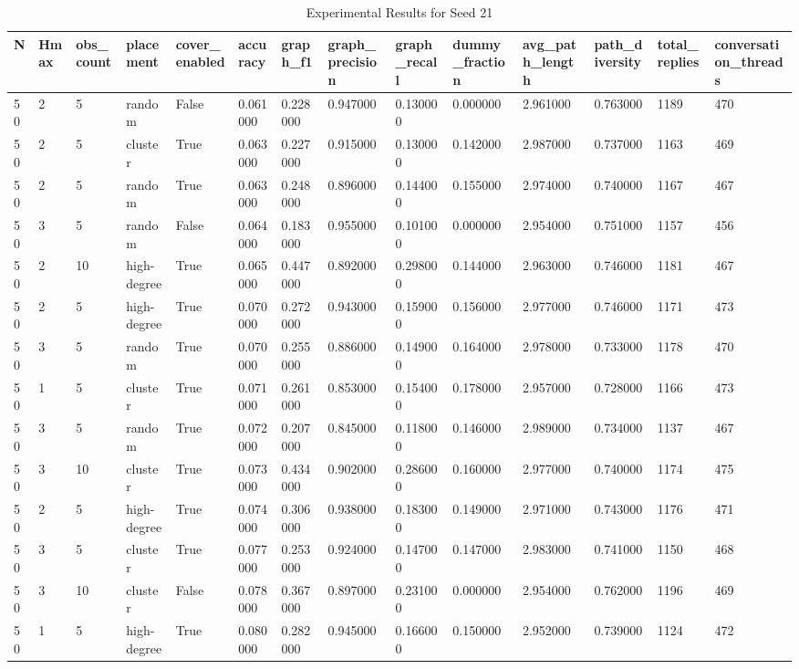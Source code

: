 \begin{table}
\caption{Experimental Results for Seed 21}
\label{tab:results_seed_21}
\begin{tabular}{llllllllllllll}
\toprule
N & Hmax & obs_count & placement & cover_enabled & accuracy & graph_f1 & graph_precision & graph_recall & dummy_fraction & avg_path_length & path_diversity & total_replies & conversation_threads \\
\midrule
50 & 2 & 5 & random & False & 0.061000 & 0.228000 & 0.947000 & 0.130000 & 0.000000 & 2.961000 & 0.763000 & 1189 & 470 \\
50 & 2 & 5 & cluster & True & 0.063000 & 0.227000 & 0.915000 & 0.130000 & 0.142000 & 2.987000 & 0.737000 & 1163 & 469 \\
50 & 2 & 5 & random & True & 0.063000 & 0.248000 & 0.896000 & 0.144000 & 0.155000 & 2.974000 & 0.740000 & 1167 & 467 \\
50 & 3 & 5 & random & False & 0.064000 & 0.183000 & 0.955000 & 0.101000 & 0.000000 & 2.954000 & 0.751000 & 1157 & 456 \\
50 & 2 & 10 & high-degree & True & 0.065000 & 0.447000 & 0.892000 & 0.298000 & 0.144000 & 2.963000 & 0.746000 & 1181 & 467 \\
50 & 2 & 5 & high-degree & True & 0.070000 & 0.272000 & 0.943000 & 0.159000 & 0.156000 & 2.977000 & 0.746000 & 1171 & 473 \\
50 & 3 & 5 & random & True & 0.070000 & 0.255000 & 0.886000 & 0.149000 & 0.164000 & 2.978000 & 0.733000 & 1178 & 470 \\
50 & 1 & 5 & cluster & True & 0.071000 & 0.261000 & 0.853000 & 0.154000 & 0.178000 & 2.957000 & 0.728000 & 1166 & 473 \\
50 & 3 & 5 & random & True & 0.072000 & 0.207000 & 0.845000 & 0.118000 & 0.146000 & 2.989000 & 0.734000 & 1137 & 467 \\
50 & 3 & 10 & cluster & True & 0.073000 & 0.434000 & 0.902000 & 0.286000 & 0.160000 & 2.977000 & 0.740000 & 1174 & 475 \\
50 & 2 & 5 & high-degree & True & 0.074000 & 0.306000 & 0.938000 & 0.183000 & 0.149000 & 2.971000 & 0.743000 & 1176 & 471 \\
50 & 3 & 5 & cluster & True & 0.077000 & 0.253000 & 0.924000 & 0.147000 & 0.147000 & 2.983000 & 0.741000 & 1150 & 468 \\
50 & 3 & 10 & cluster & False & 0.078000 & 0.367000 & 0.897000 & 0.231000 & 0.000000 & 2.954000 & 0.762000 & 1196 & 469 \\
50 & 1 & 5 & high-degree & True & 0.080000 & 0.282000 & 0.945000 & 0.166000 & 0.150000 & 2.952000 & 0.739000 & 1124 & 472 \\

\end{tabular}
\end{table}
